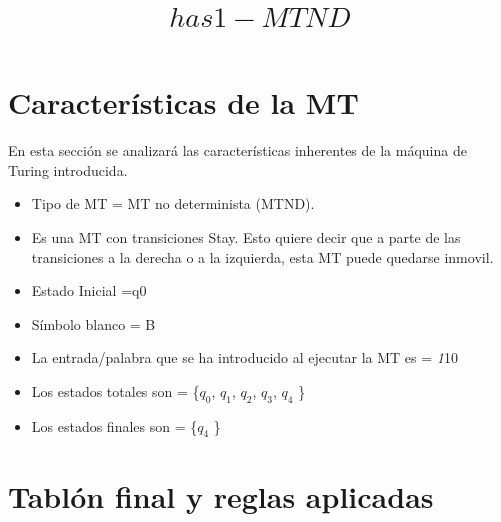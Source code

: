 ﻿\documentclass[a4paper,10pt]{article}
\title{$has1-MTND$}
\author{}
\date{}
\begin{document}
\maketitle

\section{Características de la MT}
En esta sección se analizará las características inherentes de la máquina de Turing introducida. \newline
\begin{itemize}
\item Tipo de MT =  MT no determinista (MTND). 
\item Es una MT con transiciones Stay. Esto quiere decir que a parte de las transiciones a la derecha o a la izquierda, esta MT puede quedarse inmovil.
\item Estado Inicial =q0
\item Símbolo blanco = B
\item La entrada/palabra que se ha introducido al ejecutar la MT es = \emph110 
\item Los estados totales son = \{$q_0$, $q_1$, $q_2$, $q_3$, $q_4$ \} 
\item Los estados finales son = \{$q_4$ \} 
\end{itemize}

\section{Tablón final y reglas aplicadas}
\end{document}
